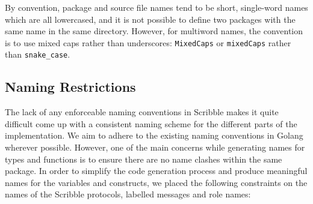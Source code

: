 \documentclass[12pt,twoside]{report}
\begin{document}
By convention, package and source file names tend to be short, single-word names which are all lowercased, and it is not possible to define two packages with the same name in the same directory. However, for multiword names, the convention is to use mixed caps rather than underscores: \texttt{MixedCaps} or \texttt{mixedCaps} rather than \texttt{snake\_case}.\\

\subsection{Naming Restrictions}\label{naming-restrictions}

The lack of any enforceable naming conventions in Scribble makes it quite difficult come up with a consistent naming scheme for the different parts of the implementation. We aim to adhere to the existing naming conventions in Golang wherever possible. However, one of the main concerns while generating names for types and functions is to ensure there are no name clashes within the same package. In order to simplify the code generation process and produce meaningful names for the variables and constructs, we placed the following constraints on the names of the Scribble protocols, labelled messages and role names:
\end{document}
